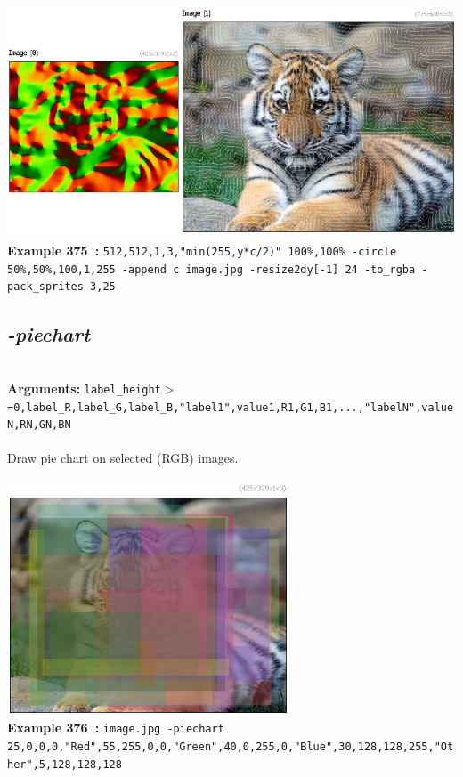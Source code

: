 \documentclass[a4paper,11pt,twoside]{book}
\begin{document}
\begin{center}\includegraphics[keepaspectratio=true,height=7cm,width=\textwidth]{img/gmic_def375.jpg}\\
{\footnotesize \textbf{Example 375~:} \texttt{512,512,1,3,"min(255,y*c/2)" 100\%,100\% -circle 50\%,50\%,100,1,255 -append c image.jpg -resize2dy[-1] 24 -to\_rgba -pack\_sprites 3,25}}
\end{center}

\subsection{\emph{-piechart} }\vspace*{-0.5em}
~\\\textbf{Arguments: } 
{\small \texttt{label\_height$>$=0,label\_R,label\_G,label\_B,"label1",value1,R1,G1,B1,...,"labelN",valueN,RN,GN,BN}}\\~\\
Draw pie chart on selected (RGB) images.
\begin{center}\includegraphics[keepaspectratio=true,height=7cm,width=\textwidth]{img/gmic_def376.jpg}\\
{\footnotesize \textbf{Example 376~:} \texttt{image.jpg -piechart 25,0,0,0,"Red",55,255,0,0,"Green",40,0,255,0,"Blue",30,128,128,255,"Other",5,128,128,128}}
\end{center}
\end{document}
